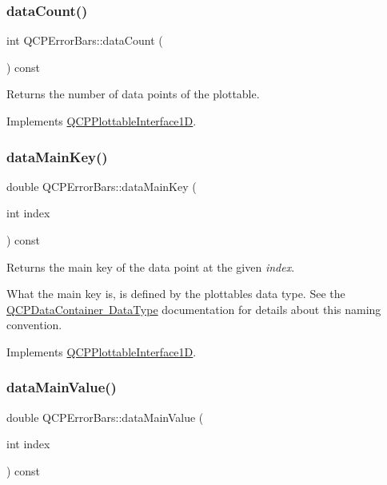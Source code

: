\subsubsection{\texorpdfstring{dataCount()}{dataCount()}}
{\footnotesize\ttfamily int Q\+C\+P\+Error\+Bars\+::data\+Count (\begin{DoxyParamCaption}{ }\end{DoxyParamCaption}) const\hspace{0.3cm}{\ttfamily [virtual]}}

Returns the number of data points of the plottable. 

Implements \mbox{\hyperlink{class_q_c_p_plottable_interface1_d_a058a22c770ef4d5a0e878a7f02183da9}{Q\+C\+P\+Plottable\+Interface1D}}.

\mbox{\label{class_q_c_p_error_bars_a7cba420078adc523efa59fb8c6ca23e0}} 
\subsubsection{\texorpdfstring{dataMainKey()}{dataMainKey()}}
{\footnotesize\ttfamily double Q\+C\+P\+Error\+Bars\+::data\+Main\+Key (\begin{DoxyParamCaption}\item[{int}]{index }\end{DoxyParamCaption}) const\hspace{0.3cm}{\ttfamily [virtual]}}

Returns the main key of the data point at the given {\itshape index}.

What the main key is, is defined by the plottable\textquotesingle{}s data type. See the \mbox{\hyperlink{class_q_c_p_data_container_qcpdatacontainer-datatype}{Q\+C\+P\+Data\+Container Data\+Type}} documentation for details about this naming convention. 

Implements \mbox{\hyperlink{class_q_c_p_plottable_interface1_d_a2bd60daaac046945fead558cbd83cf73}{Q\+C\+P\+Plottable\+Interface1D}}.

\mbox{\label{class_q_c_p_error_bars_ae9f6c79c03147efb1a67742c55386dc8}} 
\subsubsection{\texorpdfstring{dataMainValue()}{dataMainValue()}}
{\footnotesize\ttfamily double Q\+C\+P\+Error\+Bars\+::data\+Main\+Value (\begin{DoxyParamCaption}\item[{int}]{index }\end{DoxyParamCaption}) const\hspace{0.3cm}{\ttfamily [virtual]}}

